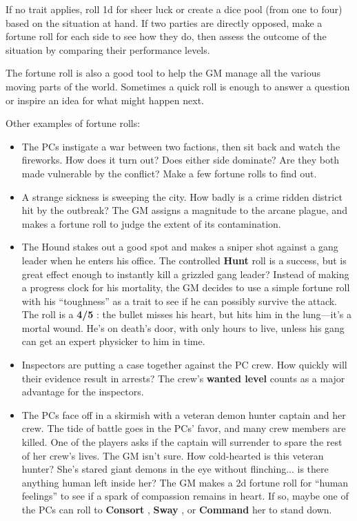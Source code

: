 \documentclass[11pt,oneside]{book}
\newcommand{\gameterm}[1]{\textbf{#1}}
\begin{document}
If no trait applies, roll 1d for sheer luck or create a dice pool (from one to four) based on the situation at hand. If two parties are directly opposed, make a fortune roll for each side to see how they do, then assess the outcome of the situation by comparing their performance levels.

The fortune roll is also a good tool to help the GM manage all the various moving parts of the world. Sometimes a quick roll is enough to answer a question or inspire an idea for what might happen next.

Other examples of fortune rolls:

\begin{itemize}
	\item The PCs instigate a war between two factions, then sit back and watch the fireworks. How does it turn out? Does either side dominate? Are they both made vulnerable by the conflict? Make a few fortune rolls to find out.
	\item A strange sickness is sweeping the city. How badly is a crime ridden district hit by the outbreak? The GM assigns a magnitude to the arcane plague, and makes a fortune roll to judge the extent of its contamination.
	\item The Hound stakes out a good spot and makes a sniper shot against a gang leader when he enters his office. The controlled \gameterm{Hunt}  roll is a success, but is great effect enough to instantly kill a grizzled gang leader? Instead of making a progress clock for his mortality, the GM decides to use a simple fortune roll with his “toughness” as a trait to see if he can possibly survive the attack. The roll is a \gameterm{4/5} : the bullet misses his heart, but hits him in the lung---it’s a mortal wound. He’s on death’s door, with only hours to live, unless his gang can get an expert physicker to him in time.
	\item Inspectors are putting a case together against the PC crew. How quickly will their evidence result in arrests? The crew’s \gameterm{wanted level}  counts as a major advantage for the inspectors.
	\item The PCs face off in a skirmish with a veteran demon hunter captain and her crew. The tide of battle goes in the PCs’ favor, and many crew members are killed. One of the players asks if the captain will surrender to spare the rest of her crew’s lives. The GM isn’t sure. How cold-hearted is this veteran hunter? She’s stared giant demons in the eye without flinching... is there anything human left inside her? The GM makes a 2d fortune roll for “human feelings” to see if a spark of compassion remains in heart. If so, maybe one of the PCs can roll to \gameterm{Consort} , \gameterm{Sway} , or \gameterm{Command}  her to stand down.
\end{itemize}
\end{document}
